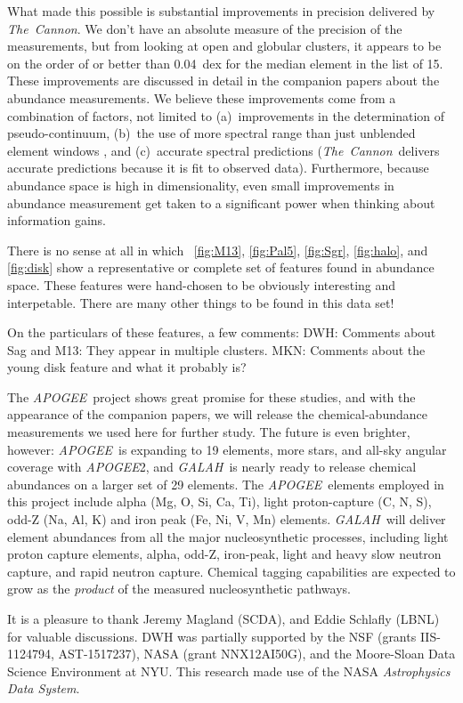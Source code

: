 \documentclass[12pt, letterpaper, preprint]{aastex}
\newcommand{\acronym}[1]{{\small{#1}}}
\newcommand{\project}[1]{\textsl{#1}}
\newcommand{\apogee}{\project{\acronym{APOGEE}}}
\newcommand{\galah}{\project{\acronym{GALAH}}}
\newcommand{\thecannon}{\project{The~Cannon}}
\begin{document}
What made this possible is substantial improvements in precision
delivered by \thecannon.
We don't have an absolute measure of the precision of the measurements,
but from looking at open and globular clusters, it appears to be on the
order of or better than 0.04~dex for the median element in the list of 15.
These improvements are discussed in detail in the companion papers
\citep{casey16, ness16} about the abundance measurements.
We believe these improvements come from a combination of factors, not
limited to (a)~improvements in the determination of pseudo-continuum,
(b)~the use of more spectral range than just unblended element windows
\citep{aspcap}, and (c)~accurate spectral predictions
(\thecannon\ delivers accurate predictions because it is fit to
observed data).
Furthermore, because abundance space is high in dimensionality, even
small improvements in abundance measurement get taken to a significant
power when thinking about information gains.

There is no sense at all in which \figurename~\ref{fig:M13},
\ref{fig:Pal5}, \ref{fig:Sgr}, \ref{fig:halo}, and \ref{fig:disk} show
a representative or complete set of features found in abundance space.
These features were hand-chosen to be obviously interesting and
interpetable.
There are many other things to be found in this data set!

On the particulars of these features, a few comments:
DWH: Comments about Sag and M13: They appear in multiple clusters.
MKN: Comments about the young disk feature and what it probably is?

The \apogee\ project shows great promise for these studies, and with
the appearance of the companion papers, we will release the
chemical-abundance measurements we used here for further study.
The future is even brighter, however: \apogee\ is expanding to 19
elements, more stars, and all-sky angular coverage with \apogee2, and
\galah\ is nearly ready to release chemical abundances on a larger set
of 29 elements.
The \apogee\ elements employed in this project include alpha
(Mg, O, Si, Ca, Ti), light proton-capture (C, N, S), odd-Z (Na, Al, K)
and iron peak (Fe, Ni, V, Mn) elements.
\galah\ will deliver element abundances from all the major
nucleosynthetic processes, including light proton capture elements,
alpha, odd-Z, iron-peak, light and heavy slow neutron capture, and
rapid neutron capture.
Chemical tagging capabilities are expected to grow as the
\emph{product} of the measured nucleosynthetic pathways.

\acknowledgements
It is a pleasure to thank
  Jeremy Magland (SCDA), and
  Eddie Schlafly (LBNL)
for valuable discussions.
DWH was partially supported by
  the NSF (grants IIS-1124794, AST-1517237),
  NASA (grant NNX12AI50G), and
  the Moore-Sloan Data Science Environment at NYU.
This research made use of the NASA \project{Astrophysics Data System}.
\end{document}
